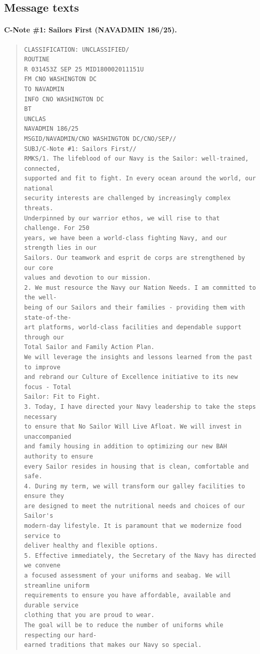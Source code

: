 \documentclass[../main.tex]{subfiles}
\begin{document}
\subsection{Message texts}
\paragraph{C-Note \#1: Sailors First (NAVADMIN 186/25).}
\begin{quote}
  \small\begin{verbatim}
CLASSIFICATION: UNCLASSIFIED/
ROUTINE
R 031453Z SEP 25 MID180002011151U
FM CNO WASHINGTON DC
TO NAVADMIN
INFO CNO WASHINGTON DC
BT
UNCLAS
NAVADMIN 186/25
MSGID/NAVADMIN/CNO WASHINGTON DC/CNO/SEP//
SUBJ/C-Note #1: Sailors First//
RMKS/1. The lifeblood of our Navy is the Sailor: well-trained, connected,
supported and fit to fight. In every ocean around the world, our national
security interests are challenged by increasingly complex threats.
Underpinned by our warrior ethos, we will rise to that challenge. For 250
years, we have been a world-class fighting Navy, and our strength lies in our
Sailors. Our teamwork and esprit de corps are strengthened by our core
values and devotion to our mission.
2. We must resource the Navy our Nation Needs. I am committed to the well-
being of our Sailors and their families - providing them with state-of-the-
art platforms, world-class facilities and dependable support through our
Total Sailor and Family Action Plan.
We will leverage the insights and lessons learned from the past to improve
and rebrand our Culture of Excellence initiative to its new focus - Total
Sailor: Fit to Fight.
3. Today, I have directed your Navy leadership to take the steps necessary
to ensure that No Sailor Will Live Afloat. We will invest in unaccompanied
and family housing in addition to optimizing our new BAH authority to ensure
every Sailor resides in housing that is clean, comfortable and safe.
4. During my term, we will transform our galley facilities to ensure they
are designed to meet the nutritional needs and choices of our Sailor's
modern-day lifestyle. It is paramount that we modernize food service to
deliver healthy and flexible options.
5. Effective immediately, the Secretary of the Navy has directed we convene
a focused assessment of your uniforms and seabag. We will streamline uniform
requirements to ensure you have affordable, available and durable service
clothing that you are proud to wear.
The goal will be to reduce the number of uniforms while respecting our hard-
earned traditions that makes our Navy so special.

\end{verbatim}
\end{quote}
\end{document}
